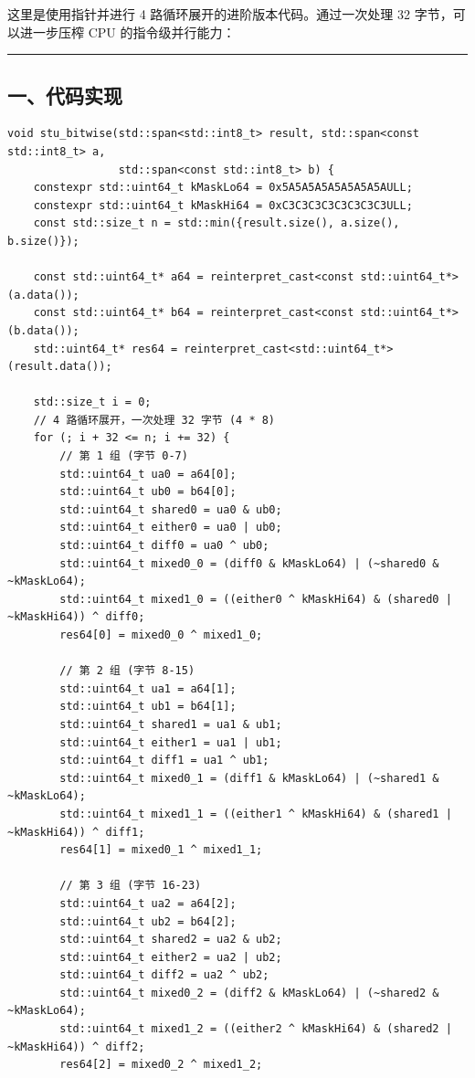 \documentclass[11pt, a4paper]{article}
\begin{document}
\begin{aibox}
这里是使用指针并进行 4 路循环展开的进阶版本代码。通过一次处理 32 字节，可以进一步压榨 CPU 的指令级并行能力：

\begin{center}\rule{\textwidth}{0.4pt}\end{center}

\subsection*{一、代码实现}

\begin{tcolorbox}[colback=white,colframe=gray!50!white,boxrule=0.5pt,arc=2pt,left=5pt,right=5pt,top=5pt,bottom=5pt]
\begin{verbatim}
void stu_bitwise(std::span<std::int8_t> result, std::span<const std::int8_t> a,
                 std::span<const std::int8_t> b) {
    constexpr std::uint64_t kMaskLo64 = 0x5A5A5A5A5A5A5A5AULL;
    constexpr std::uint64_t kMaskHi64 = 0xC3C3C3C3C3C3C3C3ULL;
    const std::size_t n = std::min({result.size(), a.size(), b.size()});
    
    const std::uint64_t* a64 = reinterpret_cast<const std::uint64_t*>(a.data());
    const std::uint64_t* b64 = reinterpret_cast<const std::uint64_t*>(b.data());
    std::uint64_t* res64 = reinterpret_cast<std::uint64_t*>(result.data());
    
    std::size_t i = 0;
    // 4 路循环展开，一次处理 32 字节 (4 * 8)
    for (; i + 32 <= n; i += 32) {
        // 第 1 组 (字节 0-7)
        std::uint64_t ua0 = a64[0];
        std::uint64_t ub0 = b64[0];
        std::uint64_t shared0 = ua0 & ub0;
        std::uint64_t either0 = ua0 | ub0;
        std::uint64_t diff0 = ua0 ^ ub0;
        std::uint64_t mixed0_0 = (diff0 & kMaskLo64) | (~shared0 & ~kMaskLo64);
        std::uint64_t mixed1_0 = ((either0 ^ kMaskHi64) & (shared0 | ~kMaskHi64)) ^ diff0;
        res64[0] = mixed0_0 ^ mixed1_0;
        
        // 第 2 组 (字节 8-15)
        std::uint64_t ua1 = a64[1];
        std::uint64_t ub1 = b64[1];
        std::uint64_t shared1 = ua1 & ub1;
        std::uint64_t either1 = ua1 | ub1;
        std::uint64_t diff1 = ua1 ^ ub1;
        std::uint64_t mixed0_1 = (diff1 & kMaskLo64) | (~shared1 & ~kMaskLo64);
        std::uint64_t mixed1_1 = ((either1 ^ kMaskHi64) & (shared1 | ~kMaskHi64)) ^ diff1;
        res64[1] = mixed0_1 ^ mixed1_1;
        
        // 第 3 组 (字节 16-23)
        std::uint64_t ua2 = a64[2];
        std::uint64_t ub2 = b64[2];
        std::uint64_t shared2 = ua2 & ub2;
        std::uint64_t either2 = ua2 | ub2;
        std::uint64_t diff2 = ua2 ^ ub2;
        std::uint64_t mixed0_2 = (diff2 & kMaskLo64) | (~shared2 & ~kMaskLo64);
        std::uint64_t mixed1_2 = ((either2 ^ kMaskHi64) & (shared2 | ~kMaskHi64)) ^ diff2;
        res64[2] = mixed0_2 ^ mixed1_2;
        

\end{verbatim}
\end{tcolorbox}
\end{aibox}
\end{document}
